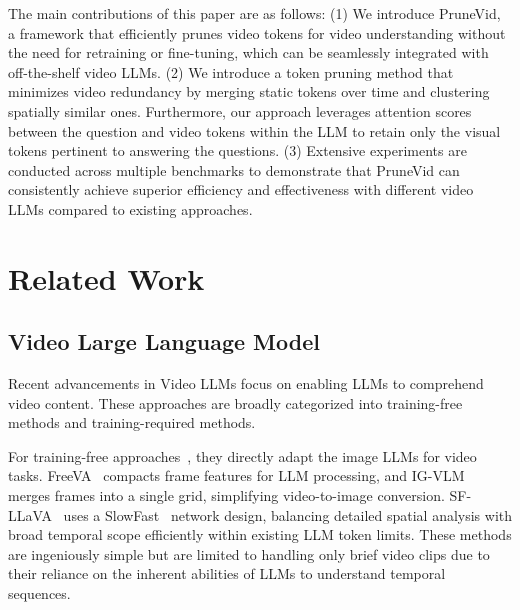 \documentclass{article} %
\begin{document}
The main contributions of this paper are as follows:
(1) We introduce PruneVid, a framework that efficiently prunes video tokens for video understanding without the need for retraining or fine-tuning, which can be seamlessly integrated with off-the-shelf video LLMs.
(2) We introduce a token pruning method that minimizes video redundancy by merging static tokens over time and clustering spatially similar ones. Furthermore, our approach leverages attention scores between the question and video tokens within the LLM to retain only the visual tokens pertinent to answering the questions.
(3) Extensive experiments are conducted across multiple benchmarks to demonstrate that PruneVid can consistently achieve superior efficiency and effectiveness with different video LLMs compared to existing approaches.

\section{Related Work}
\label{sec:related work}
\subsection{Video Large Language Model}
Recent advancements in Video LLMs focus on enabling LLMs to comprehend video content. These approaches are broadly categorized into training-free methods and training-required methods.

For training-free approaches~\citep{wu2024freeva,igvlm,sfllava}, they directly adapt the image LLMs for video tasks. FreeVA~\citep{wu2024freeva} compacts frame features for LLM processing, and IG-VLM~\citep{igvlm} merges frames into a single grid, simplifying video-to-image conversion. SF-LLaVA~\citep{sfllava} uses a SlowFast~\citep{slowfast} network design, balancing detailed spatial analysis with broad temporal scope efficiently within existing LLM token limits. These methods are ingeniously simple but are limited to handling only brief video clips due to their reliance on the inherent abilities of LLMs to understand temporal sequences.
\end{document}
